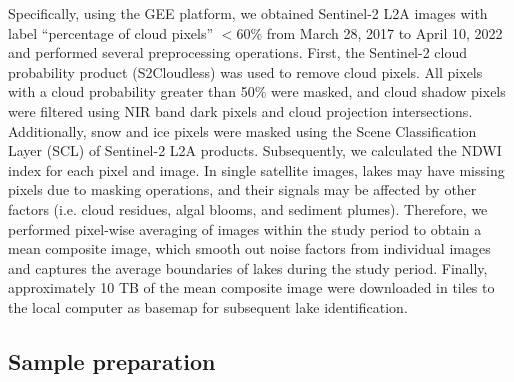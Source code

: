 \documentclass[preprint,12pt,authoryear]{elsarticle}
\begin{document}
Specifically, using the GEE platform, we obtained Sentinel-2 L2A images with label “percentage of cloud pixels” $<60\%$ from March 28, 2017 to April 10, 2022 and performed several preprocessing operations. First, the Sentinel-2 cloud probability product (S2Cloudless) was used to remove cloud pixels. All pixels with a cloud probability greater than 50\% were masked, and cloud shadow pixels were filtered using NIR band dark pixels and cloud projection intersections. Additionally, snow and ice pixels were masked using the Scene Classification Layer (SCL) of Sentinel-2 L2A products. Subsequently, we calculated the NDWI index for each pixel and image. In single satellite images, lakes may have missing pixels due to masking operations, and their signals may be affected by other factors (i.e. cloud residues, algal blooms, and sediment plumes). Therefore, we performed pixel-wise averaging of images within the study period to obtain a mean composite image, which smooth out noise factors from individual images and captures the average boundaries of lakes during the study period. Finally, approximately 10 TB of the mean composite image were downloaded in tiles to the local computer as basemap for subsequent lake identification.

\subsection{Sample preparation}
\label{subsec2}
\end{document}
